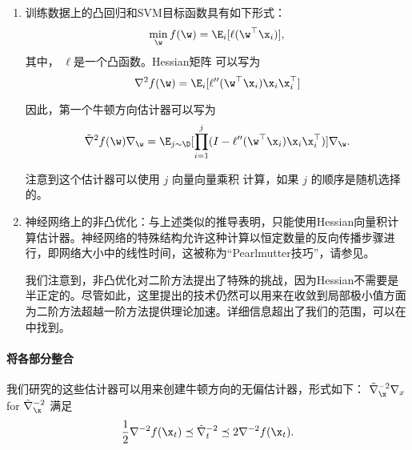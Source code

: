 \begin{enumerate}
\item
训练数据上的凸回归和SVM目标函数具有如下形式：
$$ \min_{\w} f(\w) =  \E_i [ \ell(\w^\top \x_i) ] , $$
其中， $\ell$是一个凸函数。Hessian矩阵 可以写为
$$ \nabla^2 f(\w) = \E_i [ \ell'' (\w^\top \x_i) \x_i \x_i^\top ] $$ 

因此，第一个牛顿方向估计器可以写为
$$ \tilde{\nabla}^2 f(\w)  \nabla_\w = \E_{j \sim \D }  [ \prod_{i = 1}^j  (I -  \ell'' (\w^\top \x_i) \x_i \x_i^\top ) ] \nabla_\w . $$

注意到这个估计器可以使用 $j$ 向量向量乘积 计算，如果 $j$ 的顺序是随机选择的。

\item

神经网络上的非凸优化：与上述类似的推导表明，只能使用Hessian向量积计算估计器。神经网络的特殊结构允许这种计算以恒定数量的反向传播步骤进行，即网络大小中的线性时间，这被称为“Pearlmutter技巧”，请参见\cite{HessianPearlmutter}。

我们注意到，非凸优化对二阶方法提出了特殊的挑战，因为Hessian不需要是半正定的。尽管如此，这里提出的技术仍然可以用来在收敛到局部极小值方面为二阶方法超越一阶方法提供理论加速。详细信息超出了我们的范围，可以在\cite{agarwal2017finding}中找到。
\end{enumerate}


\paragraph{
    将各部分整合
    } 
我们研究的这些估计器可以用来创建牛顿方向的无偏估计器，形式如下：
$ \tilde{\nabla}_\x^{-2} \nabla_x $
for $\tilde{\nabla}^{-2}_\x $ 
满足
$$\frac{1}{2} {\nabla}^{-2}f(\x_t) \preceq \tilde{\nabla}_t^{-2} \preceq 2 {\nabla}^{-2}f(\x_t) . $$

